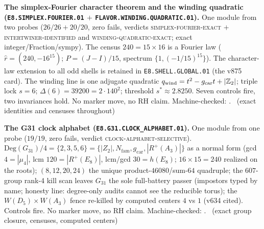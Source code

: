 \documentclass[11pt,a4paper]{article}
\newcommand{\gcar}{g_{\mathrm{car}}}
\newcommand{\Nfam}{N_{\mathrm{fam}}}
\newcommand{\Z}{\mathbb{Z}}
\theoremstyle{definition}
\begin{document}
\par\smallskip\noindent\textbf{The simplex-Fourier character
theorem and the winding quadratic
(\texttt{E8.SIMPLEX.\allowbreak FOURIER.01} $+$
\texttt{FLAVOR.\allowbreak WINDING.\allowbreak QUADRATIC.01}).}
One module from two probes ($26/26 + 20/20$, zero fails,
verdicts \textsc{simplex-fourier-exact} $+$
\textsc{intertwiner-identified} and
\textsc{winding-quadratic-exact}; exact
integer/Fraction/sympy).  The census $240 = 15\times16$ is a
Fourier law ($\hat r = (240, -16^{15})$; $P = (J - I)/15$,
spectrum $\{1, (-1/15)^{15}\}$). The character-law extension to all odd shells is retained in \texttt{E8.SHELL.GLOBAL.01} (the v875 card).  The winding line is one adjugate
quadratic $q_{\rm wind} = t^2 - \gcar t + |\Z_2|$; triple lock
$s = 6$; $\Delta(6) = 39200 = 2\cdot140^2$; threshold
$s^* \approx 2.8250$.  Seven controls fire, two invariances
hold.  No marker move, no RH claim.
Machine-checked: .
\mE\ (exact identities and censuses throughout)
\par\smallskip

\par\smallskip\noindent\textbf{The G31 clock alphabet
(\texttt{E8.G31.\allowbreak CLOCK\_ALPHABET.01}).}
One module from one probe ($19/19$, zero fails, verdict
\textsc{clock-alphabet-selective}).
$\mathrm{Deg}(G_{31})/4 = \{2,3,5,6\} = \{|Z_2|, \Nfam, \gcar,
|R^+(A_3)|\}$ as a normal form (gcd $4 = |\mu_4|$, lcm $120 =
|R^+(E_8)|$, lcm/gcd $30 = h(E_8)$; $16 \times 15 = 240$
realized on the roots); $(8,12,20,24)$ the unique
product-$46080$/sum-$64$ quadruple; the $607$-group rank-4 kill
scan leaves $G_{31}$ the sole full-battery passer (impostors
typed by name; honesty line: degree-only audits cannot see the
reducible torus); the $W(D_5)\times W(A_3)$ fence re-killed by
computed centers $4$ vs $1$ (v634 cited).  Controls fire.  No
marker move, no RH claim.
Machine-checked: .
\mE\ (exact group closure, censuses, computed centers)
\par\smallskip
\end{document}
